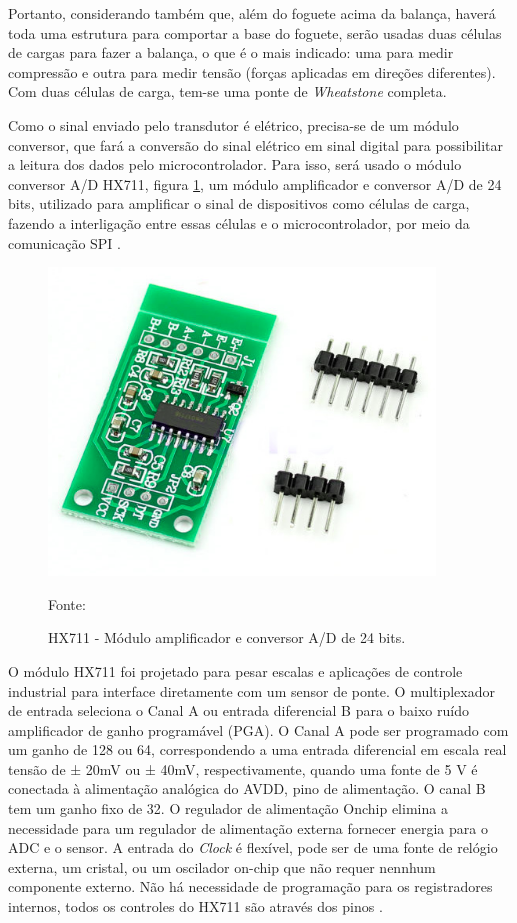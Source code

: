 \par Portanto, considerando também que, além do foguete acima da balança, haverá toda uma estrutura para comportar a base do foguete, serão usadas duas células de cargas para fazer a balança, o que é o mais indicado: uma para medir compressão e outra para medir tensão (forças aplicadas em direções diferentes). Com duas células de carga, tem-se uma ponte de \textit{Wheatstone} completa.

\par Como o sinal enviado pelo transdutor é elétrico, precisa-se de um módulo conversor, que fará a conversão do sinal elétrico em sinal digital para possibilitar a leitura dos dados pelo microcontrolador. Para isso, será usado o módulo conversor A/D HX711, figura \ref{fig:conversorHX711}, um módulo amplificador e conversor A/D de 24 bits, utilizado para amplificar o sinal de dispositivos como células de carga, fazendo a interligação entre essas células e o microcontrolador, por meio da comunicação SPI \cite{avia_HX711}.

\begin{figure}[H]
  \centering
  \includegraphics[scale=0.6]{figuras/conversorHX711.png}
  \caption{HX711 - Módulo amplificador e conversor A/D de 24 bits.}
  {\footnotesize Fonte: \cite{figura_HX711}} 
  \label{fig:conversorHX711}
\end{figure}

\par O módulo HX711 foi projetado para pesar escalas e aplicações de controle industrial para interface diretamente com um sensor de ponte. O multiplexador de entrada seleciona o Canal A ou entrada diferencial B para o baixo ruído amplificador de ganho programável (PGA). O Canal A pode ser programado com um ganho de 128 ou 64,
correspondendo a uma entrada diferencial em escala real tensão de ± 20mV ou ± 40mV, respectivamente, quando uma fonte de 5 V é conectada à alimentação analógica do AVDD, pino de alimentação. O canal B tem um ganho fixo de 32. O regulador de alimentação Onchip elimina a necessidade para um regulador de alimentação externa fornecer energia para o ADC e o sensor. A entrada do \textit{Clock} é
flexível, pode ser de uma fonte de relógio externa, um
cristal, ou um oscilador on-chip que não requer nennhum componente externo. Não há necessidade de programação para os
registradores internos, todos os controles do HX711 são
através dos pinos \cite{avia_HX711}.

